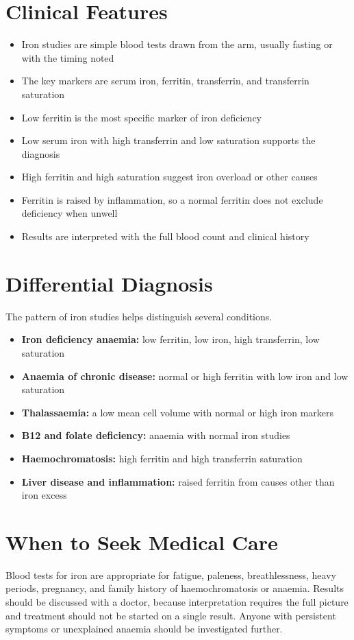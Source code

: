 \section*{Clinical Features}
\begin{itemize}
    \item Iron studies are simple blood tests drawn from the arm, usually fasting or with the timing noted
    \item The key markers are serum iron, ferritin, transferrin, and transferrin saturation
    \item Low ferritin is the most specific marker of iron deficiency
    \item Low serum iron with high transferrin and low saturation supports the diagnosis
    \item High ferritin and high saturation suggest iron overload or other causes
    \item Ferritin is raised by inflammation, so a normal ferritin does not exclude deficiency when unwell
    \item Results are interpreted with the full blood count and clinical history
\end{itemize}

\section*{Differential Diagnosis}
The pattern of iron studies helps distinguish several conditions.
\begin{itemize}
    \item \textbf{Iron deficiency anaemia:} low ferritin, low iron, high transferrin, low saturation
    \item \textbf{Anaemia of chronic disease:} normal or high ferritin with low iron and low saturation
    \item \textbf{Thalassaemia:} a low mean cell volume with normal or high iron markers
    \item \textbf{B12 and folate deficiency:} anaemia with normal iron studies
    \item \textbf{Haemochromatosis:} high ferritin and high transferrin saturation
    \item \textbf{Liver disease and inflammation:} raised ferritin from causes other than iron excess
\end{itemize}

\section*{When to Seek Medical Care}
Blood tests for iron are appropriate for fatigue, paleness, breathlessness, heavy periods, pregnancy, and family history of haemochromatosis or anaemia. Results should be discussed with a doctor, because interpretation requires the full picture and treatment should not be started on a single result. Anyone with persistent symptoms or unexplained anaemia should be investigated further.


